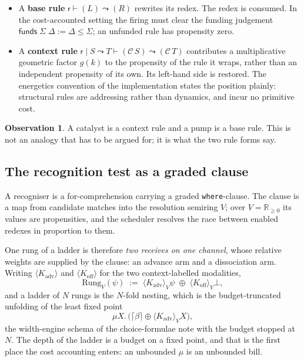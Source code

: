 \documentclass[11pt]{article}
\theoremstyle{plain}
\theoremstyle{definition}
\newtheorem{observation}[theorem]{Observation}
\theoremstyle{remark}
\newcommand{\Kctx}[1]{\langle K_{#1}\rangle}
\newcommand{\grade}[1]{\lceil #1 \rceil}
\newcommand{\Rnn}{\mathbb{R}_{\geq 0}}
\begin{document}
\begin{itemize}[leftmargin=*]
\item A \textbf{base rule} $\mathsf{r} \vdash (L) \leadsto (R)$ rewrites its
  redex. The redex is consumed. In the cost-accounted setting the firing must
  clear the funding judgement $\mathsf{funds}\;\Sigma\;\Delta := \Delta \leq
  \Sigma$; an unfunded rule has propensity zero.
\item A \textbf{context rule} $\mathsf{r} \mid S \leadsto T \vdash
  (\mathcal{C}\,S) \leadsto (\mathcal{C}\,T)$ contributes a multiplicative
  geometric factor $g(k)$ to the propensity of the rule it wraps, rather than
  an independent propensity of its own. Its left-hand side is restored. The
  energetics convention of the implementation states the position plainly:
  structural rules are addressing rather than dynamics, and incur no primitive
  cost.
\end{itemize}

\begin{observation}
A catalyst is a context rule and a pump is a base rule. This is not an
analogy that has to be argued for; it is what the two rule forms say.
\end{observation}

\subsection{The recognition test as a graded clause}

A recogniser is a for-comprehension carrying a graded \texttt{where}-clause.
The clause is a map from candidate matches into the resolution semiring $V$;
over $V = \Rnn$ its values are propensities, and the scheduler resolves the
race between enabled redexes in proportion to them.

One rung of a ladder is therefore \emph{two receives on one channel}, whose
relative weights are supplied by the clause: an advance arm and a dissociation
arm. Writing $\Kctx{\mathrm{adv}}$ and $\Kctx{\mathrm{off}}$ for the two
context-labelled modalities,
\[
\mathrm{Rung}_V(\psi) \;:=\;
\Kctx{\mathrm{adv}}_V \psi \;\oplus\; \Kctx{\mathrm{off}}_V \bot ,
\]
and a ladder of $N$ rungs is the $N$-fold nesting, which is the
budget-truncated unfolding of the least fixed point
\[
\mu X.\,\bigl(\grade{\beta} \oplus \Kctx{\mathrm{adv}}_V X\bigr) ,
\]
the width-engine schema of the choice-formulae note with the budget stopped at
$N$. The depth of the ladder is a budget on a fixed point, and that is the
first place the cost accounting enters: an unbounded $\mu$ is an unbounded
bill.
\end{document}
